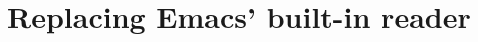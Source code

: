 \documentclass[a4paper,10pt,twoside]{report}
\newcommand{\el}{Emacs Lisp}
\newcommand{\cl}{Common Lisp}
\newcommand{\elr}{el-reader}
\newcommand{\emacs}{GNU~Emacs}
\begin{document}








\section{Replacing Emacs’ built-in reader}
\label{sec:repl-reader}
\end{document}
